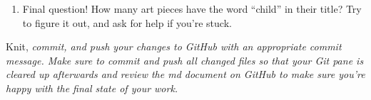 \documentclass[
]{article}
\providecommand{\tightlist}{%
  \setlength{\itemsep}{0pt}\setlength{\parskip}{0pt}}
\begin{document}
\begin{enumerate}
\def\labelenumi{\arabic{enumi}.}
\setcounter{enumi}{13}
\tightlist
\item
  Final question! How many art pieces have the word ``child'' in their
  title? Try to figure it out, and ask for help if you're stuck.
\end{enumerate}

Knit, \emph{commit, and push your changes to GitHub with an appropriate
commit message. Make sure to commit and push all changed files so that
your Git pane is cleared up afterwards and review the md document on
GitHub to make sure you're happy with the final state of your work.}
\end{document}
